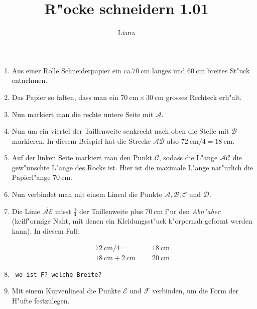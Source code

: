 \documentclass{scrartcl}
\begin{document}
  \title{R"ocke schneidern 1.01}
  \author{Liana}
\maketitle

\begin{enumerate}
  \item Aus einer Rolle Schneiderpapier ein ca.$\SI{70}{\centi\meter}$ langes
    und $\SI{60}{\centi\meter}$ breites St"uck entnehmen.

  \item Das Papier so falten, dass man ein $\SI{70}{\centi\meter}\times
    \SI{30}{\centi\meter}$ grosses Rechteck erh"alt.
 
  \item Nun markiert man die rechte untere Seite mit $\mathcal{A}$.
 
  \item Nun um ein viertel der Taillenweite senkrecht nach oben die Stelle mit 
    $\mathcal{B}$ markieren. In diesem Beispiel hat die Strecke
    $\overline{\mathcal{AB}}$ also $\SI{72}{\centi\meter}/4 = 
    \SI{18}{\centi\meter}$.
 
  \item Auf der linken Seite markiert man den Punkt $\mathcal{C}$, sodass
    die L"ange $\mathcal{AC}$ die gew"unschte L"ange des Rocks ist. Hier ist
    die maximale L"ange nat"urlich die Papierl"ange $\SI{70}{\centi\meter}$.
  
  \item Nun verbindet man mit einem Lineal die Punkte 
    $\mathcal{A,B,C} \text{ und } \mathcal{D}$.
  
  \item Die Linie $\overline{\mathcal{AE}}$ misst $\frac{1}{4}$ der Taillenweite
    plus $\SI{70}{\centi\meter}$ f"ur den \emph{Abn"aher} (keilf"ormige Naht,
    mit  denen ein Kleidungsst"uck k"orpernah geformt werden kann). In diesem
    Fall: \vspace{-1cm}

      \begin{align*}
	\SI{72}{\centi\meter}/4=&~\SI{18}{\centi\meter} \\
	\SI{18}{\centi\meter}+\SI{2}{\centi\meter}=&~\SI{20}{\centi\meter}
	\label{abnaeher}
      \end{align*}

  \item \Emailct ~\texttt{wo ist F? welche Breite?} %

  \item Mit einem Kurvenlineal die Punkte $\mathcal{E}\text{ und }
      \mathcal{F}$ verbinden, um die Form der H"ufte festzulegen.
 

\end{enumerate}
\end{document}
